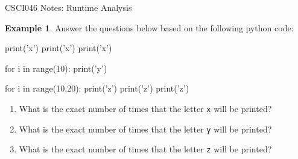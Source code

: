 \documentclass[10pt]{article}
\theoremstyle{definition}
\newtheorem{example}{Example}
\begin{document}
\begin{center}
    {
\Large
CSCI046 Notes: Runtime Analysis
}

\end{center}

\vspace{0.25in}
\noindent

\begin{example}
Answer the questions below based on the following python code:
\begin{python}
print('x')
print('x')
print('x')

for i in range(10):
    print('y')

for i in range(10,20):
    print('z')
    print('z')
    print('z')
\end{python}
    \begin{enumerate}
        \item What is the exact number of times that the letter \texttt{x} will be printed?
            \vspace{1.5in}
        \item What is the exact number of times that the letter \texttt{y} will be printed?
            \vspace{1.5in}
        \item What is the exact number of times that the letter \texttt{z} will be printed?
    \end{enumerate}
\end{example}
\end{document}
